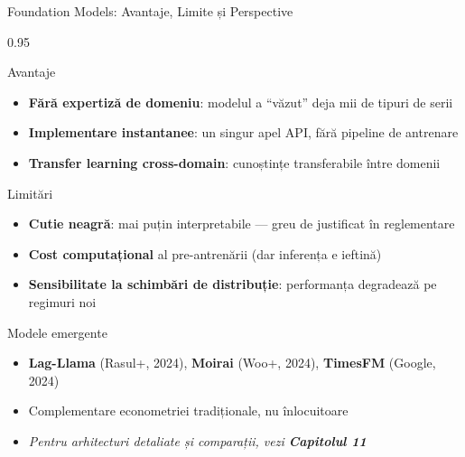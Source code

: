 \documentclass[9pt, aspectratio=169, t]{beamer}
\begin{document}
\begin{frame}{Foundation Models: Avantaje, Limite și Perspective}
    \vspace{-2mm}
    \begin{cminipage}{0.95\textwidth}
        {\scriptsize
        \begin{exampleblock}{Avantaje}
            \begin{itemize}\setlength{\itemsep}{0pt}
                \item \textbf{Fără expertiză de domeniu}: modelul a ``văzut'' deja mii de tipuri de serii
                \item \textbf{Implementare instantanee}: un singur apel API, fără pipeline de antrenare
                \item \textbf{Transfer learning cross-domain}: cunoștințe transferabile între domenii
            \end{itemize}
        \end{exampleblock}
        \vspace{-2mm}
        \begin{alertblock}{Limitări}
            \begin{itemize}\setlength{\itemsep}{0pt}
                \item \textbf{Cutie neagră}: mai puțin interpretabile --- greu de justificat în reglementare
                \item \textbf{Cost computațional} al pre-antrenării (dar inferența e ieftină)
                \item \textbf{Sensibilitate la schimbări de distribuție}: performanța degradează pe regimuri noi
            \end{itemize}
        \end{alertblock}
        \vspace{-2mm}
        \begin{block}{Modele emergente}
            \begin{itemize}\setlength{\itemsep}{0pt}
                \item \textbf{Lag-Llama} (Rasul+, 2024), \textbf{Moirai} (Woo+, 2024), \textbf{TimesFM} (Google, 2024)
                \item Complementare econometriei tradiționale, nu înlocuitoare
                \item \textit{Pentru arhitecturi detaliate și comparații, vezi \textbf{Capitolul 11}}
            \end{itemize}
        \end{block}
        }
    \end{cminipage}
\end{frame}
\end{document}
